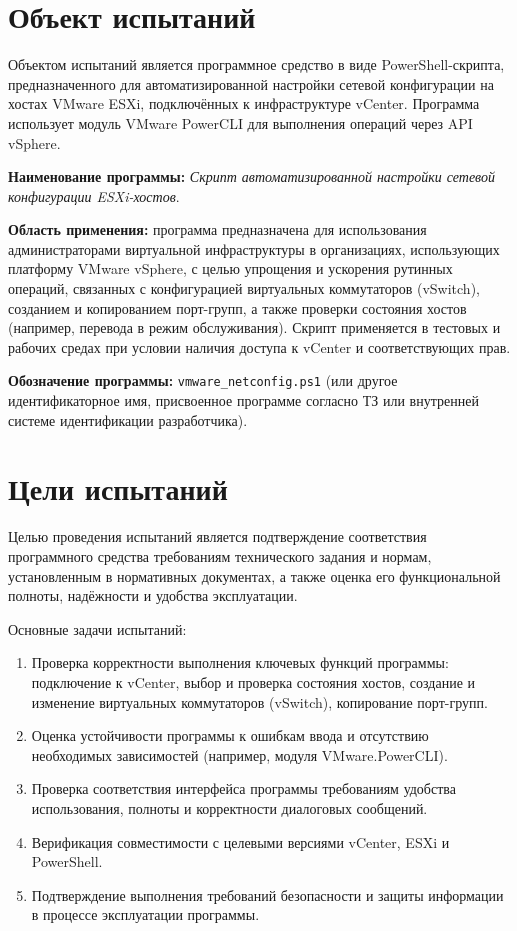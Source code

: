 \newpage
\section{Объект испытаний}

Объектом испытаний является программное средство в виде PowerShell-скрипта, предназначенного для автоматизированной настройки сетевой конфигурации на хостах VMware ESXi, подключённых к инфраструктуре vCenter. Программа использует модуль VMware PowerCLI для выполнения операций через API vSphere.

\textbf{Наименование программы:} \textit{Скрипт автоматизированной настройки сетевой конфигурации ESXi-хостов}.

\textbf{Область применения:} программа предназначена для использования администраторами виртуальной инфраструктуры в организациях, использующих платформу VMware vSphere, с целью упрощения и ускорения рутинных операций, связанных с конфигурацией виртуальных коммутаторов (vSwitch), созданием и копированием порт-групп, а также проверки состояния хостов (например, перевода в режим обслуживания). Скрипт применяется в тестовых и рабочих средах при условии наличия доступа к vCenter и соответствующих прав.

\textbf{Обозначение программы:} \texttt{vmware\_netconfig.ps1} (или другое идентификаторное имя, присвоенное программе согласно ТЗ или внутренней системе идентификации разработчика).

\newpage
\section{Цели испытаний}

Целью проведения испытаний является подтверждение соответствия программного средства требованиям технического задания и нормам, установленным в нормативных документах, а также оценка его функциональной полноты, надёжности и удобства эксплуатации.

\medskip

Основные задачи испытаний:

\begin{enumerate}
    \item Проверка корректности выполнения ключевых функций программы: подключение к vCenter, выбор и проверка состояния хостов, создание и изменение виртуальных коммутаторов (vSwitch), копирование порт-групп.
    \item Оценка устойчивости программы к ошибкам ввода и отсутствию необходимых зависимостей (например, модуля VMware.PowerCLI).
    \item Проверка соответствия интерфейса программы требованиям удобства использования, полноты и корректности диалоговых сообщений.
    \item Верификация совместимости с целевыми версиями vCenter, ESXi и PowerShell.
    \item Подтверждение выполнения требований безопасности и защиты информации в процессе эксплуатации программы.
\end{enumerate}

